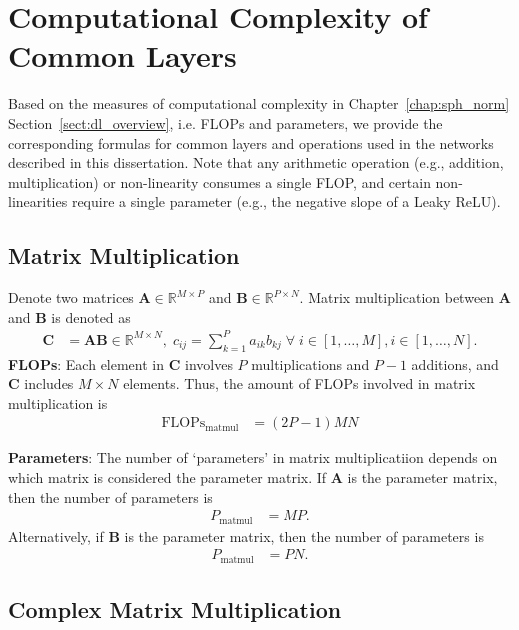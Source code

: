 \chapter{Computational Complexity of Common Layers}
\label{appdx:complexity}
Based on the measures of computational complexity in Chapter~\ref{chap:sph_norm} Section~\ref{sect:dl_overview}, i.e. FLOPs and parameters, we provide the corresponding formulas for common layers and operations used in the networks described in this dissertation. Note that any arithmetic operation (e.g., addition, multiplication) or non-linearity consumes a single FLOP, and certain non-linearities require a single parameter (e.g., the negative slope of a Leaky ReLU).

\section{Matrix Multiplication} \label{appdx:complexity-matmul}

Denote two matrices $\mathbf{A} \in \mathbb{R}^{M \times P}$ and $\mathbf{B} \in \mathbb{R}^{P \times N}$. Matrix multiplication between $\mathbf{A}$ and $\mathbf{B}$ is denoted as
\begin{align*}
	\mathbf{C} &= \mathbf{A}\mathbf{B} \in \mathbb{R}^{M\times N}, \; c_{ij} = \sum_{k=1}^P a_{ik}b_{kj} \; \forall \; i\in [1,\dots,M], i\in [1,\dots,N].
\end{align*}
\textbf{FLOPs}: Each element in $\mathbf{C}$ involves $P$ multiplications and $P-1$ additions, and $\mathbf{C}$ includes $M \times N$ elements. Thus, the amount of FLOPs involved in matrix multiplication is
\begin{align*}
	\text{FLOPs}_{\text{matmul}} &= (2P-1)MN
\end{align*}

\textbf{Parameters}: The number of `parameters' in matrix multiplicatiion depends on which matrix is considered the parameter matrix. If $\mathbf{A}$ is the parameter matrix, then the number of parameters is
\begin{align*}
	P_{\text{matmul}} &= MP.
\end{align*}
Alternatively, if $\mathbf{B}$ is the parameter matrix, then the number of parameters is
\begin{align*}
	P_{\text{matmul}} &= PN.
\end{align*}

\section{Complex Matrix Multiplication}  \label{appdx:complexity-matmul-comp}

